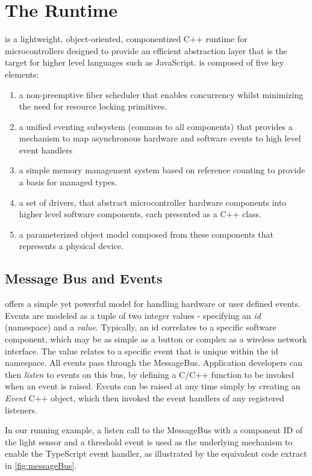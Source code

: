 \section{The \CO Runtime}
\label{sec:codal}

\CO is a lightweight, object-oriented, componentized C++ runtime for microcontrollers designed to provide an efficient abstraction layer that is the target for higher level languages such as JavaScript. \CO is composed of five key elements:

\begin{enumerate} 
\item a non-preemptive fiber scheduler that enables concurrency whilst minimizing the need for resource locking primitives.
\item a unified eventing subsystem (common to all components) that provides a mechanism to map asynchronous hardware and software events to high level event handlers 
\item a simple memory management system based on reference counting to provide a basis for managed types.
\item a set of drivers, that abstract microcontroller hardware components into higher level software components, each presented as a C++ class.    
\item a parameterized object model composed from these components that represents a physical device.
\end{enumerate}

\subsection{Message Bus and Events}

\CO offers a simple yet powerful model for handling hardware or user defined events. Events are modeled as a tuple of two integer values - specifying an \emph{id} (namespace) and a \emph{value}. 
Typically, an id correlates to a specific software component, which may be as simple as a button or complex as a wireless network interface. The value relates to a specific event that is unique within the id namespace. All events pass through the \CO MessageBus. Application developers can then \emph{listen} to events on this bus, by defining a C/C++ function to be invoked when an event is raised. Events can be raised at any time simply by creating an \emph{Event} C++ object, which then invoked the event handlers of any registered listeners.

In our running example, a listen call to the MessageBus with a component ID of the light sensor and a threshold event is used as the underlying mechanism to enable the TypeScript event handler, as illustrated by the equivalent \CO code extract in \ref{fig:messageBus}. 

